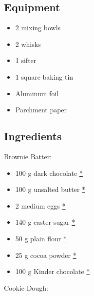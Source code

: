 \documentclass[
]{book}
\providecommand{\tightlist}{%
  \setlength{\itemsep}{0pt}\setlength{\parskip}{0pt}}
\begin{document}
\subsection*{Equipment}\label{equipment-6}

\begin{itemize}
\tightlist
\item
  2 mixing bowls
\item
  2 whisks
\item
  1 sifter
\item
  1 square baking tin
\item
  Aluminum foil
\item
  Parchment paper
\end{itemize}

\subsection*{Ingredients}\label{ingredients-6}

Brownie Batter:

\begin{itemize}
\tightlist
\item
  100 g dark chocolate
  \href{https://www.publix.com/pd/lilys-baking-chips-dark-chocolate/RIO-PCI-541806?origin=search8}{*}
\item
  100 g unsalted butter
  \href{https://www.publix.com/pd/land-o-lakes-unsalted-butter-made-with-sweet-cream/RIO-PCI-112513?origin=search2}{*}
\item
  2 medium eggs
  \href{https://www.publix.com/pd/publix-eggs-large/RIO-PCI-145492?origin=search8}{*}
\item
  140 g caster sugar
  \href{https://www.publix.com/pd/publix-sugar-pure-granulated-extra-fine/RIO-PCI-143101?origin=search1}{*}
\item
  50 g plain flour
  \href{https://www.publix.com/pd/publix-all-purpose-flour/RIO-PCI-104014?origin=search1}{*}
\item
  25 g cocoa powder
  \href{https://www.publix.com/pd/hersheys-dutched-cocoa-special-dark/RIO-PCI-102330?origin=search1}{*}
\item
  100 g Kinder chocolate
  \href{https://www.publix.com/pd/kinder-chocolate/RIO-PCI-613809?origin=search1}{*}
\end{itemize}

Cookie Dough:
\end{document}
